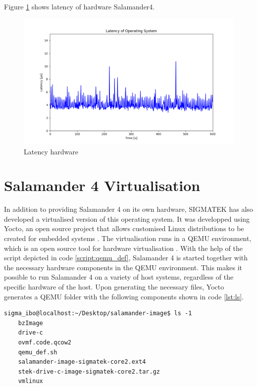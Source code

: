 \documentclass[MMR,Master,english]{twbook}
\begin{document}
Figure \ref{fig:max_latency_hardware} shows latency of hardware Salamander4.
\begin{figure}[H]
	\centering
	\includegraphics[width=0.8\columnwidth]{img/max_latency_hardware.png}
	\caption[Latency hardware]{Latency hardware}
	\label{fig:max_latency_hardware}
\end{figure}
\clearpage
\section{Salamander 4 Virtualisation}
In addition to providing Salamander 4 on its own hardware, SIGMATEK has also developed a virtualised version of this operating system. It was developped using Yocto, an open source project that allows customised Linux distributions to be created for embedded systems \cite{WelcomeYoctoProject}. The virtualisation runs in a QEMU environment, which is an open source tool for hardware virtualisation \cite{QEMU}. With the help of the script depicted in code \ref{script:qemu_def}, Salamander 4 is started together with the necessary hardware components in the QEMU environment. This makes it possible to run Salamander 4 on a variety of host systems, regardless of the specific hardware of the host. Upon generating the necessary files, Yocto generates a QEMU folder with the following components shown in code \ref{lst:ls}.

\vspace{1em}
\begin{minipage}{\linewidth}
	\begin{lstlisting}[name={Contents of QEMU folder for Salamander 4},label={lst:ls}]
    sigma_ibo@localhost:~/Desktop/salamander-image$ ls -1
    bzImage
    drive-c
    ovmf.code.qcow2
    qemu_def.sh
    salamander-image-sigmatek-core2.ext4
    stek-drive-c-image-sigmatek-core2.tar.gz
    vmlinux
    \end{lstlisting}
\end{minipage}
\end{document}
